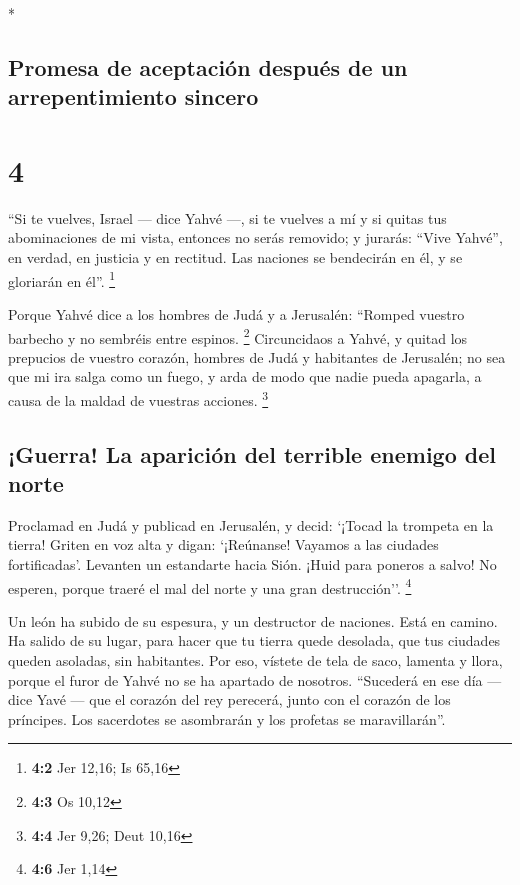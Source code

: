 \begin{paracol}{2}
\begin{otherlanguage}{english}
\end{otherlanguage}

\switchcolumn[0]*

\hypertarget{promesa-de-aceptaciuxf3n-despuuxe9s-de-un-arrepentimiento-sincero}{%
\subsection{Promesa de aceptación después de un arrepentimiento
sincero}\label{promesa-de-aceptaciuxf3n-despuuxe9s-de-un-arrepentimiento-sincero}}

\hypertarget{section-6}{%
\section{4}\label{section-6}}

 ``Si te vuelves, Israel --- dice Yahvé ---, si te vuelves
a mí y si quitas tus abominaciones de mi vista, entonces no serás
removido;  y jurarás: ``Vive Yahvé'', en verdad, en
justicia y en rectitud. Las naciones se bendecirán en él, y se gloriarán
en él''. \footnote{\textbf{4:2} Jer 12,16; Is 65,16}

 Porque Yahvé dice a los hombres de Judá y a Jerusalén:
``Romped vuestro barbecho y no sembréis entre espinos. \footnote{\textbf{4:3}
  Os 10,12}  Circuncidaos a Yahvé, y quitad los prepucios
de vuestro corazón, hombres de Judá y habitantes de Jerusalén; no sea
que mi ira salga como un fuego, y arda de modo que nadie pueda apagarla,
a causa de la maldad de vuestras acciones. \footnote{\textbf{4:4} Jer
  9,26; Deut 10,16}

\hypertarget{guerra-la-apariciuxf3n-del-terrible-enemigo-del-norte}{%
\subsection{¡Guerra! La aparición del terrible enemigo del
norte}\label{guerra-la-apariciuxf3n-del-terrible-enemigo-del-norte}}

 Proclamad en Judá y publicad en Jerusalén, y decid:
`¡Tocad la trompeta en la tierra! Griten en voz alta y digan:
`¡Reúnanse! Vayamos a las ciudades fortificadas'. 
Levanten un estandarte hacia Sión. ¡Huid para poneros a salvo! No
esperen, porque traeré el mal del norte y una gran destrucción''.
\footnote{\textbf{4:6} Jer 1,14}

 Un león ha subido de su espesura, y un destructor de
naciones. Está en camino. Ha salido de su lugar, para hacer que tu
tierra quede desolada, que tus ciudades queden asoladas, sin habitantes.
 Por eso, vístete de tela de saco, lamenta y llora, porque
el furor de Yahvé no se ha apartado de nosotros. 
``Sucederá en ese día --- dice Yavé --- que el corazón del rey perecerá,
junto con el corazón de los príncipes. Los sacerdotes se asombrarán y
los profetas se maravillarán''.


\end{paracol}

